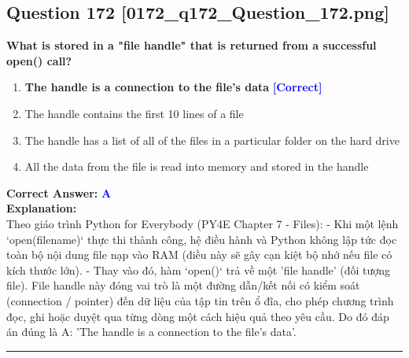 \documentclass[11pt,a4paper]{article}
\begin{document}
\begin{minipage}{\textwidth}
\subsection*{Question 172 \quad \footnotesize{[0172_q172_Question_172.png]}}
\noindent \textbf{What is stored in a "file handle" that is returned from a successful open() call?}

\begin{enumerate}[label=\Alph*.]
    \item \textbf{The handle is a connection to the file's data} \hfill \textcolor{blue}{\textbf{[Correct]}}
    \item The handle contains the first 10 lines of a file
    \item The handle has a list of all of the files in a particular folder on the hard drive
    \item All the data from the file is read into memory and stored in the handle
\end{enumerate}

\noindent \textbf{Correct Answer:} \textcolor{blue}{\textbf{A}} \\[4pt]
\noindent \textbf{Explanation:}\\
Theo giáo trình Python for Everybody (PY4E Chapter 7 - Files):\newline
- Khi một lệnh `open(filename)` thực thi thành công, hệ điều hành và Python không lập tức đọc toàn bộ nội dung file nạp vào RAM (điều này sẽ gây cạn kiệt bộ nhớ nếu file có kích thước lớn).\newline
- Thay vào đó, hàm `open()` trả về một 'file handle' (đối tượng file). File handle này đóng vai trò là một đường dẫn/kết nối có kiểm soát (connection / pointer) đến dữ liệu của tập tin trên ổ đĩa, cho phép chương trình đọc, ghi hoặc duyệt qua từng dòng một cách hiệu quả theo yêu cầu.\newline
Do đó đáp án đúng là A: 'The handle is a connection to the file's data'.
\end{minipage}
\vspace{0.8cm}
\hrule
\vspace{0.5cm}
\end{document}
